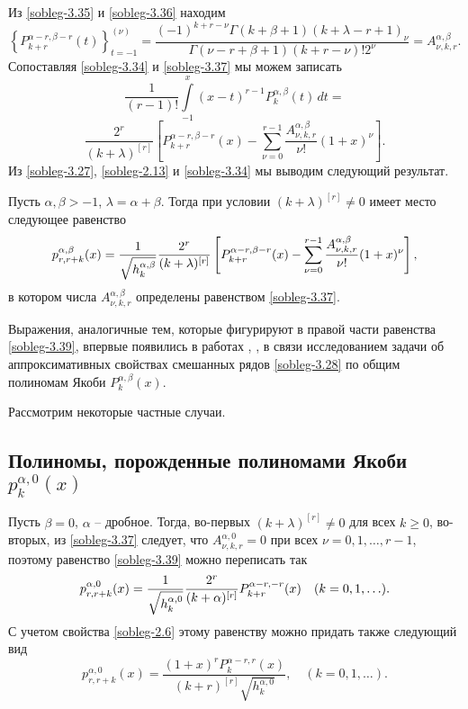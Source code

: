 Из \eqref{sobleg-3.35}  и \eqref{sobleg-3.36} находим
\begin{equation}\label{sobleg-3.37}
\left\{P_{k+r}^{\alpha-r,\beta-r}(t)\right\}_{t=-1}^{(\nu)}=
\frac{(-1)^{k+r-\nu}\Gamma(k+\beta+1)(k+\lambda-r+1)_{\nu}}
{\Gamma(\nu-r+\beta+1)(k+r-\nu)!2^\nu}
=A_{\nu,k,r}^{\alpha,\beta}.
\end{equation}
Сопоставляя \eqref{sobleg-3.34} и \eqref{sobleg-3.37} мы можем записать
$$\frac{1}{(r-1)!}\int\limits^x_{-1}(x-t)^{r-1}P_k^{\alpha,\beta}(t)\,dt=$$
\begin{equation}\label{sobleg-3.38}
\frac{2^r}{(k+\lambda)^{[r]}}\left[P_{k+r}^{\alpha-r,\beta-r}(x)
-\sum^{r-1}_{\nu=0}\frac{A_{\nu,k,r}^{\alpha,\beta}}{\nu!}(1+x)^{\nu}\right].
\end{equation}
Из \eqref{sobleg-3.27}, \eqref{sobleg-2.13} и \eqref{sobleg-3.34} мы выводим следующий результат.

\begin{theorem}\label{soblegtheo2}
Пусть $\alpha, \beta>-1$, $\lambda=\alpha+\beta$. Тогда  при условии $(k+\lambda)^{[r]}\neq0$ имеет место следующее равенство
\begin{equation}\label{sobleg-3.39}
p_{r,r+k}^{\alpha,\beta}(x) ={1\over\sqrt{ h_k^{\alpha,\beta}}}
\frac{2^r}{(k+\lambda)^{[r]}}\left[P_{k+r}^{\alpha-r,\beta-r}(x)
-\sum^{r-1}_{\nu=0}\frac{A_{\nu,k,r}^{\alpha,\beta}}{\nu!}(1+x)^{\nu}\right] ,
\end{equation}
в котором числа $A_{\nu,k,r}^{\alpha,\beta}$ определены равенством \eqref{sobleg-3.37}.
\end{theorem}

\begin{remark}
  Выражения, аналогичные тем, которые фигурируют в правой части равенства  \eqref{sobleg-3.39}, впервые появились в   работах \cite{Shar13}, \cite{Shar17}, \cite{Shar18} в связи исследованием задачи об аппроксимативных свойствах смешанных рядов \eqref{sobleg-3.28} по общим полиномам Якоби $P_{k}^{\alpha,\beta}(x)$.
\end{remark}


  Рассмотрим некоторые частные случаи.

\subsection{Полиномы, порожденные полиномами Якоби $p_{k}^{\alpha,0}(x)$}


 Пусть $\beta=0$, $\alpha$ -- дробное. Тогда, во-первых $(k+\lambda)^{[r]}\neq0$ для всех $k\ge0$, во-вторых,  из \eqref{sobleg-3.37} следует, что $A_{\nu,k,r}^{\alpha,0}=0$ при всех  $\nu=0,1,\dots, r-1$, поэтому равенство \eqref{sobleg-3.39} можно переписать так
 \begin{equation}\label{sobleg-3.40}
p_{r,r+k}^{\alpha,0}(x) ={1\over\sqrt{ h_k^{\alpha,0}}}
\frac{2^r}{(k+\alpha)^{[r]}}P_{k+r}^{\alpha-r,-r}(x) \quad (k=0,1,\ldots).
\end{equation}
С учетом свойства \eqref{sobleg-2.6} этому равенству можно придать также следующий вид
\begin{equation}\label{sobleg-3.41}
p_{r,r+k}^{\alpha,0}(x) =
\frac{(1+x)^rP_{k}^{\alpha-r,r}(x)}{(k+r)^{[r]}\sqrt{ h_k^{\alpha,0}}},
 \quad (k=0,1,\ldots).
\end{equation}
